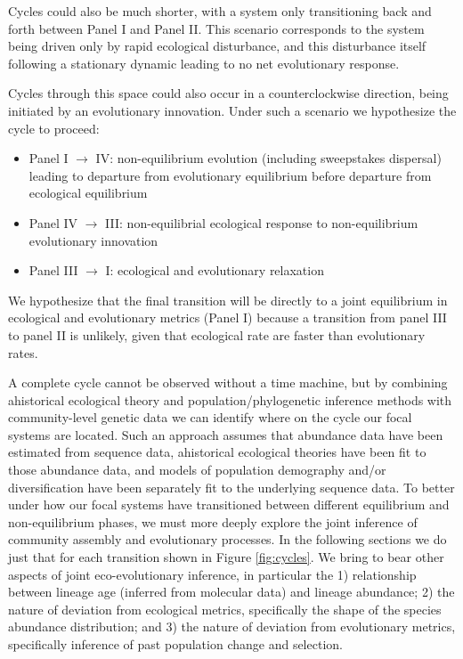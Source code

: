 \documentclass[12pt]{article}
\begin{document}
Cycles could also be much shorter, with a system only transitioning
back and forth between Panel I and Panel II. This scenario corresponds
to the system being driven only by rapid ecological disturbance, and
this disturbance itself following a stationary dynamic leading to no
net evolutionary response.

Cycles through this space could also occur in a counterclockwise
direction, being initiated by an evolutionary innovation. Under such a
scenario we hypothesize the cycle to proceed:

\begin{itemize}
\item Panel I $\rightarrow$ IV: non-equilibrium evolution (including
  sweepstakes dispersal) leading to departure from evolutionary
  equilibrium before departure from ecological equilibrium
\item Panel IV $\rightarrow$ III: non-equilibrial ecological response
  to non-equilibrium evolutionary innovation
\item Panel III $\rightarrow$ I: ecological and evolutionary
  relaxation
\end{itemize}

We hypothesize that the final transition will be directly to a joint
equilibrium in ecological and evolutionary metrics (Panel I) because a
transition from panel III to panel II is unlikely, given that
ecological rate are faster than evolutionary rates.

A complete cycle cannot be observed without a time machine, but by
combining ahistorical ecological theory and population/phylogenetic
inference methods with community-level genetic data we can identify
where on the cycle our focal systems are located. Such an approach
assumes that abundance data have been estimated from sequence data,
ahistorical ecological theories have been fit to those abundance data,
and models of population demography and/or diversification have been
separately fit to the underlying sequence data. To better under how
our focal systems have transitioned between different equilibrium and
non-equilibrium phases, we must more deeply explore the joint
inference of community assembly and evolutionary processes. In the
following sections we do just that for each transition shown in Figure
\ref{fig:cycles}. We bring to bear other aspects of joint
eco-evolutionary inference, in particular the 1) relationship between
lineage age (inferred from molecular data) and lineage abundance; 2)
the nature of deviation from ecological metrics, specifically the
shape of the species abundance distribution; and 3) the nature of
deviation from evolutionary metrics, specifically inference of past
population change and selection.
\end{document}
